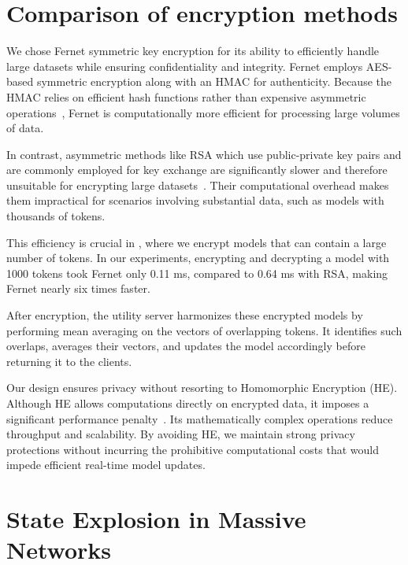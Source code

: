\section{Comparison of encryption methods}
\label{app:encrypt}

We chose Fernet symmetric key encryption for its ability to efficiently handle large datasets while ensuring confidentiality and integrity. Fernet employs AES-based symmetric encryption along with an HMAC for authenticity. Because the HMAC relies on efficient hash functions rather than expensive asymmetric operations~\cite{raj2023performance}, Fernet is computationally more efficient for processing large volumes of data.

In contrast, asymmetric methods like RSA which use public-private key pairs and are commonly employed for key exchange are significantly slower and therefore unsuitable for encrypting large datasets~\cite{menezes2018handbook}. Their computational overhead makes them impractical for scenarios involving substantial data, such as \wordvec models with thousands of tokens.

This efficiency is crucial in \Sys, where we encrypt \wordvec models that can contain a large number of tokens. In our experiments, encrypting and decrypting a \wordvec model with 1000 tokens took Fernet only 0.11 ms, compared to 0.64 ms with RSA, making Fernet nearly six times faster.

After encryption, the utility server harmonizes these encrypted models by performing mean averaging on the vectors of overlapping tokens. It identifies such overlaps, averages their vectors, and updates the model accordingly before returning it to the clients.

Our design ensures privacy without resorting to Homomorphic Encryption (HE). Although HE allows computations directly on encrypted data, it imposes a significant performance penalty~\cite{naehrig2011can}. Its mathematically complex operations reduce throughput and scalability. By avoiding HE, we maintain strong privacy protections without incurring the prohibitive computational costs that would impede efficient real-time model updates.

\section{State Explosion in Massive Networks}
\label{state:explosion}

